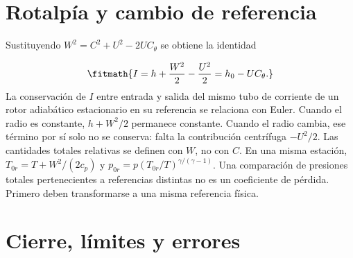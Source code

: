 \documentclass[10pt,openany]{book}
\begin{document}
\begin{minipage}{\linewidth}
{\begin{tikzpicture}
\end{tikzpicture}}%
\else
{}%
\fi
\fi
\endgroup
\par\nopagebreak
{}
\end{minipage}
\par\vspace{\baselineskip}

\section{Rotalpía y cambio de referencia}


Sustituyendo \(W^2=C^2+U^2-2UC_\theta\) se obtiene la identidad



\[
\fitmath{I=h+\frac{W^2}{2}-\frac{U^2}{2}=h_0-UC_\theta.}
\]
La conservación de \(I\) entre entrada y salida del mismo tubo de corriente de un rotor adiabático estacionario en su referencia se relaciona con Euler. Cuando el radio es constante, \(h+W^2/2\) permanece constante. Cuando el radio cambia, ese término por sí solo no se conserva: falta la contribución centrífuga \(-U^2/2\).
Las cantidades totales relativas se definen con \(W\), no con \(C\). En una misma estación, \(T_{0r}=T+W^2/(2c_p)\) y \(p_{0r}=p(T_{0r}/T)^{\gamma/(\gamma-1)}\). Una comparación de presiones totales pertenecientes a referencias distintas no es un coeficiente de pérdida. Primero deben transformarse a una misma referencia física.

\section{Cierre, límites y errores}
\end{document}
